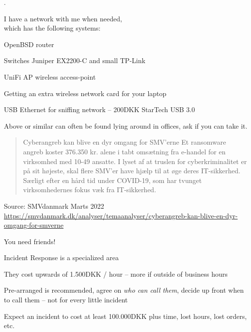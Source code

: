\documentclass[Screen16to9,17pt]{foils}
\begin{document}
.

\begin{list1}
\item I have a network with me when needed, \\
which has the following systems:
\begin{list2}
\item OpenBSD router
\item Switches Juniper EX2200-C and small TP-Link
\item UniFi AP wireless access-point
\item Getting an extra wireless network card for your laptop
\item USB Ethernet for sniffing network -- 200DKK StarTech USB 3.0
\end{list2}
\end{list1}

Above or similar can often be found lying around in offices, ask if you can take it.




\begin{quote}
Cyberangreb kan blive en dyr omgang for SMV’erne
Et ransomware angreb koster 376.350 kr. alene i tabt omsætning fra e-handel for en virksomhed med 10-49 ansatte. I lyset af at truslen for cyberkriminalitet er på sit højeste, skal flere SMV’er have hjælp til at øge deres IT-sikkerhed. Særligt efter en hård tid under COVID-19, som har tvunget virksomhedernes fokus væk fra IT-sikkerhed.
\end{quote}
Source: SMVdanmark Marts 2022 \url{https://smvdanmark.dk/analyser/temaanalyser/cyberangreb-kan-blive-en-dyr-omgang-for-smverne}

\begin{list2}
\item You need friends!

\item Incident Response is a specialized area

\item They cost upwards of 1.500DKK / hour -- more if outside of business hours
\item Pre-arranged is recommended, agree on \emph{who can call them}, decide up front when to call them -- not for every little incident
\item Expect an incident to cost at least 100.000DKK plus time, lost hours, lost orders, etc.
\end{list2}
\end{document}
